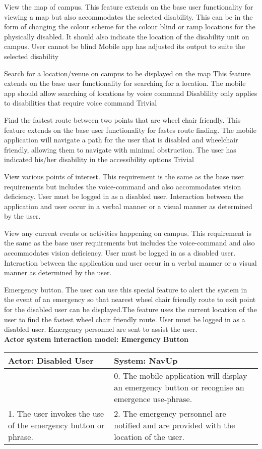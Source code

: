 \FuncReq
{View the map of campus.}
{This feature extends on the base user functionality for viewing a map but also accommodates the selected disability. This can be in the form of changing the colour scheme for the colour blind or ramp locations for the physically disabled. It should also indicate the location of the disability unit on campus.}
{User cannot be blind}
{Mobile app has adjusted its output to suite the selected disability}

\FuncReq
{Search for a location/venue on campus to be displayed on the map}
{This feature extends on the base user functionality for searching for a location. The mobile app should allow searching of locations by voice command}
{Disablility only applies to disabilities that require voice command}
{Trivial}

\FuncReq
{Find the fastest route between two points that are wheel chair friendly.}%
{This feature extends on the base user functionality for fastes route finding. The mobile application will navigate a path for the user that is disabled and wheelchair friendly, allowing them to navigate with minimal obstruction.}
{The user has indicated his/her disability in the accessibility options}
{Trivial}

\FuncReq
{View various points of interest.}
{This requirement is the same as the base user requirements but includes the voice-command and also accommodates vision deficiency.}
{User must be logged in as a disabled user.}
{Interaction between the application and user occur in a verbal manner or a visual manner as determined by the user.}

\FuncReq
{View any current events or activities happening on campus.}
{This requirement is the same as the base user requirements but includes the voice-command and also accommodates vision deficiency.}
{User must be logged in as a disabled user.}
{Interaction between the application and user occur in a verbal manner or a visual manner as determined by the user.}

\FuncReq
{Emergency button.}
{The user can use this special feature to alert the system in the event of an emergency so that nearest wheel chair friendly route to exit point for the disabled user can be displayed.The feature uses the current location of the user to find the fastest wheel chair friendly route.}
{User must be logged in as a disabled user.}
{Emergency personnel are sent to assist the user.}
    \\
    \textbf{Actor system interaction model: Emergency Button}\\
    \begin{tabular}{ | p{6cm} | p{6cm} |}
    \hline
    Actor: Disabled User & System: NavUp \\ \hline
     & 0. The mobile application will display an emergency button or recognise an emergence use-phrase.\\ \hline
    1. The user invokes the use of the emergency button or phrase. & 2. The emergency personnel are notified and are provided with the location of the user.\\ \hline   
    \end{tabular}
\\
\bigskip
